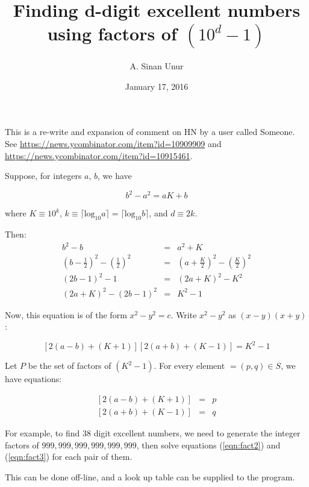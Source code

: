 \documentclass[12pt,letterpaper]{article}
\begin{document}
\title{Finding d-digit excellent numbers using factors of $(10^d - 1)$}

\author{A. Sinan Unur}

\date{January 17, 2016}

\maketitle

This is a re-write and expansion of comment on HN by a user called Someone. See \url{https://news.ycombinator.com/item?id=10909909} and \url{https://news.ycombinator.com/item?id=10915461}.

Suppose, for integers $a$, $b$, we have

\[ b^2 - a^2 = aK + b \]

where $K\equiv 10^{k}$, $k\equiv\lceil\mathrm{log}_{10}a\rceil=\lceil\mathrm{log}_{10}b\rceil$, and $d\equiv 2k$.

Then:
%
\begin{eqnarray}
%
b^2 - b & = & a^2 + K \\
%
(b - \frac{1}{2})^2 - (\frac{1}{2})^2 & = & (a + \frac{K}{2})^2 - (\frac{K}{2})^2 \\
%
(2b - 1)^2 - 1 & = & (2a + K)^2 - K^2 \\
%
(2a + K)^2 - (2b - 1)^2 & = & K^2 - 1
%
\end{eqnarray}

Now, this equation is of the form $x^2 - y^2 = c$. Write $x^2 - y^2$ as $(x - y)(x + y)$:

\begin{equation}
%
\left[2(a - b) + (K + 1)\right] \left[2(a + b) + (K - 1)\right] = K^2 - 1 \label{eqn:fact1}
%
\end{equation}

Let $P$ be the set of factors of $(K^2 - 1)$. For every element $ = (p,q)\in S$, we have equations:

\begin{eqnarray}
%
\left[2(a - b) + (K + 1)\right] & = & p \label{eqn:fact2}\\
%
\left[2(a + b) + (K - 1)\right] & = & q \label{eqn:fact3}
%
\end{eqnarray}

For example, to find 38 digit excellent numbers, we need to generate the integer factors of $999,999,999,999,999,999$, then solve equations (\ref{eqn:fact2}) and (\ref{eqn:fact3}) for each pair of them.

This can be done off-line, and a look up table can be supplied to the program.
\end{document}
